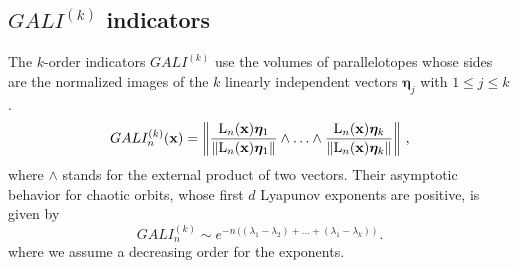 \subsection{$GALI^{(k)}$ indicators\label{subsec:other}}
%
The $k$-order indicators $GALI^{(k)}$ use the volumes of parallelotopes whose sides are the normalized images of the $k$ linearly independent vectors $\boldsymbol{\eta}_j$ with $1\le j\le k$.
%
%
\begin{equation}
  GALI^{(k)}_n ( \vb{x})= \left \Vert \frac{\mathrm{L}_n(\vb{x}) \boldsymbol{\eta}_1 }{ \Vert \mathrm{L}_n(\vb{x}) \boldsymbol{\eta}_1 \Vert}
    \wedge \ldots \wedge \frac{\mathrm{L}_n(\vb{x}) \boldsymbol{\eta}_k}{ \Vert \mathrm{L}_n(\vb{x}) \boldsymbol{\eta}_k\Vert} \right \Vert \,,
  \label{eq2_22}
\end{equation}
%
where $\wedge$ stands for the external product of two vectors. Their asymptotic behavior for chaotic orbits, whose first $d$ Lyapunov exponents are positive, is given by
\begin{equation}
    GALI^{(k)}_n \sim e^{-n\,\bigl((\lambda_1-\lambda_2) +\ldots+(\lambda_1-\lambda_k)\,\bigr)}  \,.
\end{equation}
where we assume a decreasing order for the exponents.

